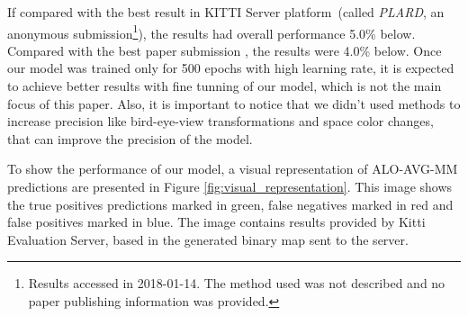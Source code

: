 If compared with the best result in KITTI Server platform~(called \textit{PLARD}, an anonymous submission\footnote{Results accessed in 2018-01-14. The method used was not described and no paper publishing information was provided.}), the results had overall performance 5.0\% below. Compared with the best paper submission \cite{Caltagirone2018}, the results were 4.0\% below. Once our model was trained only for 500 epochs with high learning rate, it is expected to achieve better results with fine tunning of our model, which is not the main focus of this paper. Also, it is important to notice that we didn't used methods to increase precision like bird-eye-view transformations and space color changes, that can improve the precision of the model.



To show the performance of our model, a visual representation of ALO-AVG-MM predictions are presented in Figure \ref{fig:visual_representation}. This image shows the true positives predictions marked in green, false negatives marked in  red and false positives marked in blue. The image contains results provided by Kitti Evaluation Server, based in the generated binary map sent to the server.

